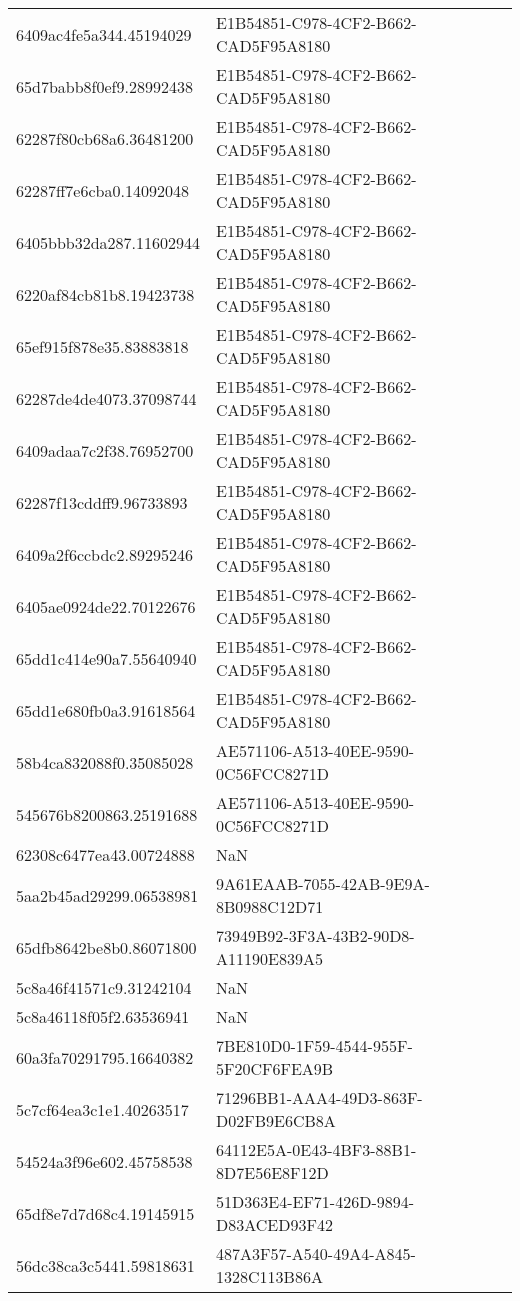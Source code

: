 \begin{tabular}{ll}
6409ac4fe5a344.45194029 & E1B54851-C978-4CF2-B662-CAD5F95A8180 \\
65d7babb8f0ef9.28992438 & E1B54851-C978-4CF2-B662-CAD5F95A8180 \\
62287f80cb68a6.36481200 & E1B54851-C978-4CF2-B662-CAD5F95A8180 \\
62287ff7e6cba0.14092048 & E1B54851-C978-4CF2-B662-CAD5F95A8180 \\
6405bbb32da287.11602944 & E1B54851-C978-4CF2-B662-CAD5F95A8180 \\
6220af84cb81b8.19423738 & E1B54851-C978-4CF2-B662-CAD5F95A8180 \\
65ef915f878e35.83883818 & E1B54851-C978-4CF2-B662-CAD5F95A8180 \\
62287de4de4073.37098744 & E1B54851-C978-4CF2-B662-CAD5F95A8180 \\
6409adaa7c2f38.76952700 & E1B54851-C978-4CF2-B662-CAD5F95A8180 \\
62287f13cddff9.96733893 & E1B54851-C978-4CF2-B662-CAD5F95A8180 \\
6409a2f6ccbdc2.89295246 & E1B54851-C978-4CF2-B662-CAD5F95A8180 \\
6405ae0924de22.70122676 & E1B54851-C978-4CF2-B662-CAD5F95A8180 \\
65dd1c414e90a7.55640940 & E1B54851-C978-4CF2-B662-CAD5F95A8180 \\
65dd1e680fb0a3.91618564 & E1B54851-C978-4CF2-B662-CAD5F95A8180 \\
58b4ca832088f0.35085028 & AE571106-A513-40EE-9590-0C56FCC8271D \\
545676b8200863.25191688 & AE571106-A513-40EE-9590-0C56FCC8271D \\
62308c6477ea43.00724888 & NaN \\
5aa2b45ad29299.06538981 & 9A61EAAB-7055-42AB-9E9A-8B0988C12D71 \\
65dfb8642be8b0.86071800 & 73949B92-3F3A-43B2-90D8-A11190E839A5 \\
5c8a46f41571c9.31242104 & NaN \\
5c8a46118f05f2.63536941 & NaN \\
60a3fa70291795.16640382 & 7BE810D0-1F59-4544-955F-5F20CF6FEA9B \\
5c7cf64ea3c1e1.40263517 & 71296BB1-AAA4-49D3-863F-D02FB9E6CB8A \\
54524a3f96e602.45758538 & 64112E5A-0E43-4BF3-88B1-8D7E56E8F12D \\
65df8e7d7d68c4.19145915 & 51D363E4-EF71-426D-9894-D83ACED93F42 \\
56dc38ca3c5441.59818631 & 487A3F57-A540-49A4-A845-1328C113B86A \\

\end{tabular}

